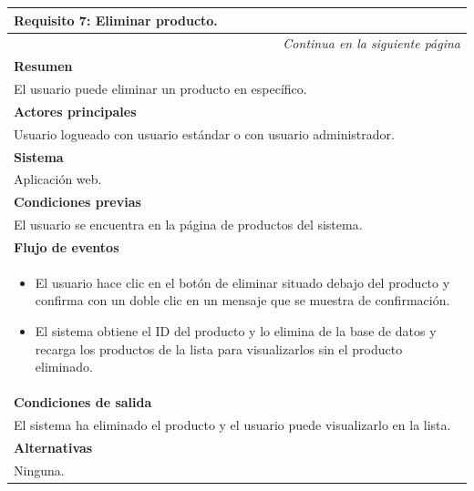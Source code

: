 \begin{longtable}{|p{}|}
\hline
 \rowcolor[gray]{.5}
 \color{white}\textbf{Requisito 7: Eliminar producto.} \\
\hline
\endfirsthead
\endhead
\hline \multicolumn{1}{r}{\textit{Continua en la siguiente página}} \\
\endfoot
\endlastfoot
    \rowcolor[gray]{.9}
     \textbf{Resumen} \\
     \hline
     El usuario puede eliminar un producto en específico. \\
     \hline
     \rowcolor[gray]{.9}
     \textbf{Actores principales} \\
     \hline
     Usuario logueado con usuario estándar o con usuario administrador. \\
     \hline
     \rowcolor[gray]{.9}
     \textbf{Sistema} \\
     \hline
     Aplicación web. \\
     \hline
     \rowcolor[gray]{.9}
     \textbf{Condiciones previas} \\
     \hline
     El usuario se encuentra en la página de productos del sistema. \\
     \hline
     \rowcolor[gray]{.9}
     \textbf{Flujo de eventos}  \\
     \hline
      \begin{itemize}
         \item El usuario hace clic en el botón de eliminar situado debajo del producto y confirma con un doble clic en un mensaje que se muestra de confirmación.
         \item El sistema obtiene el ID del producto y lo elimina de la base de datos y recarga los productos de la lista para visualizarlos sin el producto eliminado.
     \end{itemize} \\
     \hline
     \rowcolor[gray]{.9}
     \textbf{Condiciones de salida} \\
     \hline
     El sistema ha eliminado el producto y el usuario puede visualizarlo en la lista. \\
     \hline
     \rowcolor[gray]{.9}
     \textbf{Alternativas}  \\
     \hline
      Ninguna.\\
     \hline
\end{longtable}

